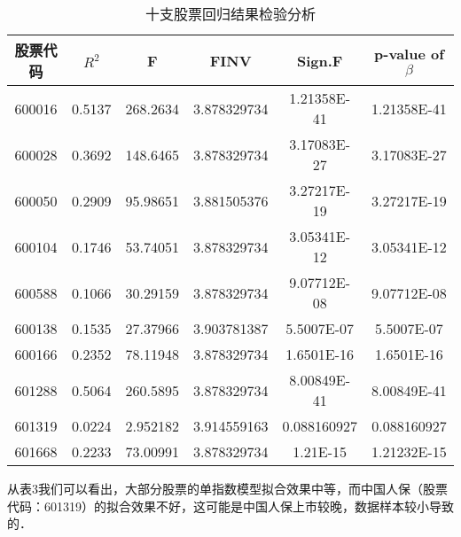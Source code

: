 \begin{table}[ht]
\centering
\caption{十支股票回归结果检验分析}\label{inv9_tab3}
\begin{tabular}{|c|c|c|c|c|c|}
\hline
股票代码 & $R^{2}$ & F & FINV& Sign.F & p-value of $\beta$\\
\hline
600016 & 0.5137 & 268.2634 & 3.878329734& 1.21358E-41 & 1.21358E-41\\
\hline
600028 & 0.3692 & 148.6465 & 3.878329734 & 3.17083E-27 & 3.17083E-27\\
\hline
600050 & 0.2909 & 95.98651 &3.881505376& 3.27217E-19 & 3.27217E-19\\
\hline
600104 & 0.1746 & 53.74051 &3.878329734& 3.05341E-12 & 3.05341E-12\\
\hline
600588 & 0.1066 & 30.29159 &3.878329734& 9.07712E-08 & 9.07712E-08\\
\hline
600138 & 0.1535 & 27.37966 &3.903781387& 5.5007E-07 & 5.5007E-07\\
\hline
600166 & 0.2352 & 78.11948 &3.878329734& 1.6501E-16 & 1.6501E-16\\
\hline
601288 & 0.5064 & 260.5895 & 3.878329734&8.00849E-41 & 8.00849E-41\\
\hline
601319 & 0.0224 & 2.952182 &3.914559163& 0.088160927 & 0.088160927\\
\hline
601668 & 0.2233 & 73.00991 &3.878329734 & 1.21E-15 & 1.21232E-15\\
\hline
\end{tabular}
\end{table}

从表3我们可以看出，大部分股票的单指数模型拟合效果中等，而中国人保（股票代码：601319）的拟合效果不好，这可能是中国人保上市较晚，数据样本较小导致的．










